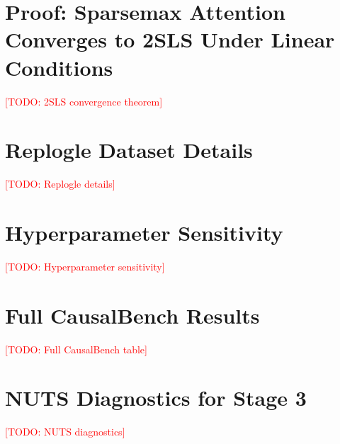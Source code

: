 \documentclass[11pt]{article}
\newcommand{\todo}[1]{\textcolor{red}{[TODO: #1]}}
\begin{document}
\appendix

\section{Proof: Sparsemax Attention Converges to 2SLS Under Linear Conditions}
\todo{2SLS convergence theorem}

\section{Replogle Dataset Details}
\todo{Replogle details}

\section{Hyperparameter Sensitivity}
\todo{Hyperparameter sensitivity}

\section{Full CausalBench Results}
\todo{Full CausalBench table}

\section{NUTS Diagnostics for Stage 3}
\todo{NUTS diagnostics}
\end{document}
